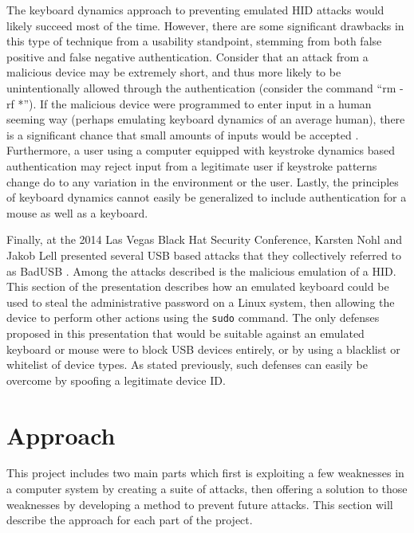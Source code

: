 \documentclass[pagenumbers]{ieee}
\begin{document}
The keyboard dynamics approach to preventing emulated HID attacks would likely succeed most of the time. However, there are some significant drawbacks in this type of technique from a usability standpoint, stemming from both false positive and false negative authentication. Consider that an attack from a malicious device may be extremely short, and thus more likely to be unintentionally allowed through the authentication (consider the command ``rm -rf *''). If the malicious device were programmed to enter input in a human seeming way (perhaps emulating keyboard dynamics of an average human), there is a significant chance that small amounts of inputs would be accepted \cite{shahzad}. Furthermore, a user using a computer equipped with keystroke dynamics based authentication may reject input from a legitimate user if keystroke patterns change do to any variation in the environment or the user. Lastly, the principles of keyboard dynamics cannot easily be generalized to include authentication for a mouse as well as a keyboard.

Finally, at the 2014 Las Vegas Black Hat Security Conference, Karsten Nohl and Jakob Lell presented several USB based attacks that they collectively referred to as BadUSB \cite{nohl}. Among the attacks described is the malicious emulation of a HID. This section of the presentation describes how an emulated keyboard could be used to steal the administrative password on a Linux system, then allowing the device to perform other actions using the \texttt{sudo} command. The only defenses proposed in this presentation that would be suitable against an emulated keyboard or mouse were to block USB devices entirely, or by using a blacklist or whitelist of device types. As stated previously, such defenses can easily be overcome by spoofing a legitimate device ID.


\section{Approach}
\label{section:approach}

This project includes two main parts which first is exploiting a few weaknesses in a computer system by creating a suite of attacks, then offering a solution to those weaknesses by developing a method to prevent future attacks. This section will describe the approach for each part of the project.
\end{document}
